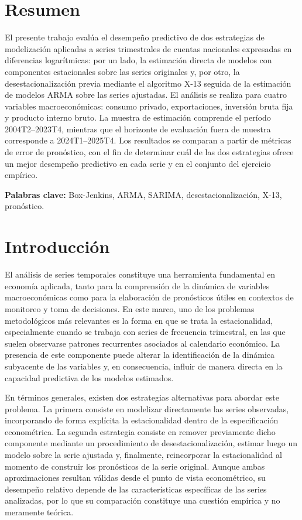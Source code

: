 \documentclass[12pt,a4paper]{article}
\begin{document}
	\section*{Resumen}
	
	El presente trabajo evalúa el desempeño predictivo de dos estrategias de modelización aplicadas a series trimestrales de cuentas nacionales expresadas en diferencias logarítmicas: por un lado, la estimación directa de modelos con componentes estacionales sobre las series originales y, por otro, la desestacionalización previa mediante el algoritmo X-13 seguida de la estimación de modelos ARMA sobre las series ajustadas. El análisis se realiza para cuatro variables macroeconómicas: consumo privado, exportaciones, inversión bruta fija y producto interno bruto. La muestra de estimación comprende el período 2004T2--2023T4, mientras que el horizonte de evaluación fuera de muestra corresponde a 2024T1--2025T4. Los resultados se comparan a partir de métricas de error de pronóstico, con el fin de determinar cuál de las dos estrategias ofrece un mejor desempeño predictivo en cada serie y en el conjunto del ejercicio empírico.
	
	\vspace{1em}
	\textbf{Palabras clave:} Box-Jenkins, ARMA, SARIMA, desestacionalización, X-13, pronóstico.
	
	\newpage
	
	\section{Introducción}
	
	El análisis de series temporales constituye una herramienta fundamental en economía aplicada, tanto para la comprensión de la dinámica de variables macroeconómicas como para la elaboración de pronósticos útiles en contextos de monitoreo y toma de decisiones. En este marco, uno de los problemas metodológicos más relevantes es la forma en que se trata la estacionalidad, especialmente cuando se trabaja con series de frecuencia trimestral, en las que suelen observarse patrones recurrentes asociados al calendario económico. La presencia de este componente puede alterar la identificación de la dinámica subyacente de las variables y, en consecuencia, influir de manera directa en la capacidad predictiva de los modelos estimados.
	
	En términos generales, existen dos estrategias alternativas para abordar este problema. La primera consiste en modelizar directamente las series observadas, incorporando de forma explícita la estacionalidad dentro de la especificación econométrica. La segunda estrategia consiste en remover previamente dicho componente mediante un procedimiento de desestacionalización, estimar luego un modelo sobre la serie ajustada y, finalmente, reincorporar la estacionalidad al momento de construir los pronósticos de la serie original. Aunque ambas aproximaciones resultan válidas desde el punto de vista econométrico, su desempeño relativo depende de las características específicas de las series analizadas, por lo que su comparación constituye una cuestión empírica y no meramente teórica.
	
\end{document}
